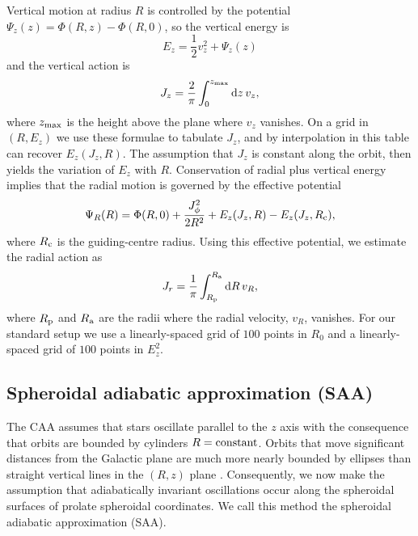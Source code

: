 \documentclass[useAMS,usenatbib,fleqn,a4paper]{mn2e}
\def\Rc{R_{\rm c}}
\def\Ra{R_{\rm a}}
\def\Rp{R_{\rm p}}
\def\half{{\textstyle{\frac12}}}
\begin{document}
Vertical motion at radius $R$ is controlled by the potential $\Psi_z(z) =
\Phi(R, z)-\Phi(R,0)$, so the vertical energy is
 \begin{equation}
E_z=\half v_z^2+\Psi_z(z)
\end{equation}
and the vertical action is
\begin{equation}
J_z = \frac{2}{\pi}\int_{0}^{z_{\rm max}}\mathrm{d}z\,v_z,
\end{equation}
 where $z_{\rm max}$ is the height above the plane where $v_z$ vanishes.  On
a grid in $(R,E_z)$ we use these formulae to tabulate $J_z$, and by
interpolation in this table can recover $E_z(J_z,R)$. The assumption that
$J_z$ is constant along the orbit, then yields the variation of $E_z$ with
$R$. Conservation of radial plus vertical energy implies that the radial
motion is governed by the effective potential
\begin{equation}
\Psi_R(R) =  \Phi(R,0) + \frac{J_\phi^2}{2R^2}+E_z(J_z,R)-E_z(J_z,\Rc),
\end{equation}
where $\Rc$ is the guiding-centre radius.
Using this effective potential, we estimate the radial action as
\begin{equation}
J_r = \frac{1}{\pi}\int_{\Rp}^{\Ra}\mathrm{d}R\,v_R,
\end{equation}
where $\Rp$ and $\Ra$ are the radii where the radial velocity, $v_R$,
vanishes. For our standard setup we use a linearly-spaced grid of $100$ points in $R_0$ and a linearly-spaced grid of $100$ points in $E_z^2$.


\subsection{Spheroidal adiabatic approximation (SAA)}\label{Method::SAA}

The CAA assumes that stars oscillate parallel
to the $z$ axis with the consequence that orbits are bounded by cylinders
$R=\hbox{constant}$. Orbits that move significant distances from the Galactic
plane are much more nearly bounded by ellipses than straight vertical lines
in the $(R,z)$ plane \citep[e.g.][Figure 3.27]{BinneyTremaine}. Consequently,
we now make the assumption that adiabatically invariant oscillations occur
along the spheroidal surfaces of prolate spheroidal coordinates. We call this
method the spheroidal adiabatic approximation (SAA).
\end{document}
